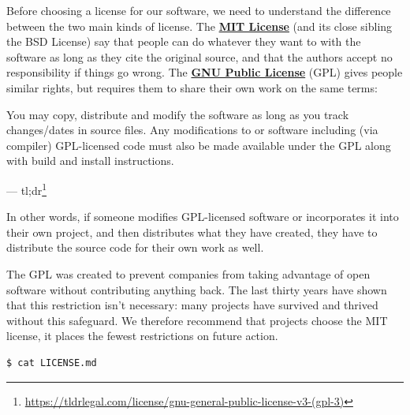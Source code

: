 \documentclass[
]{krantz}
\renewenvironment{quote}{\begin{VF}}{\end{VF}}
\renewcommand{\href}[2]{#2\footnote{\url{#1}}}
\newcommand{\gref}[2]{\hyperlink{#2}{\textbf{#1}}}
\begin{document}
Before choosing a license for our software,
we need to understand the difference between
the two main kinds of license.
The \gref{MIT License}{mit\_license}
(and its close sibling the BSD License)
say that people can do whatever they want to with the software as long as they cite the original source,
and that the authors accept no responsibility if things go wrong.
The \gref{GNU Public License}{gpl} (GPL)
gives people similar rights,
but requires them to share their own work on the same terms:

\begin{quote}
You may copy, distribute and modify the software as long as you track changes/dates in source files.
Any modifications to or software including (via compiler) GPL-licensed code
must also be made available under the GPL
along with build and install instructions.

--- \href{https://tldrlegal.com/license/gnu-general-public-license-v3-(gpl-3)}{tl;dr}
\end{quote}

In other words,
if someone modifies GPL-licensed software or incorporates it into their own project,
and then distributes what they have created,
they have to distribute the source code for their own work as well.

The GPL was created to prevent companies from taking advantage of open software
without contributing anything back.
The last thirty years have shown that this restriction isn't necessary:
many projects have survived and thrived without this safeguard.
We therefore recommend that projects choose the MIT license,
it places the fewest restrictions on future action.

\begin{verbatim}
$ cat LICENSE.md
\end{verbatim}
\end{document}
